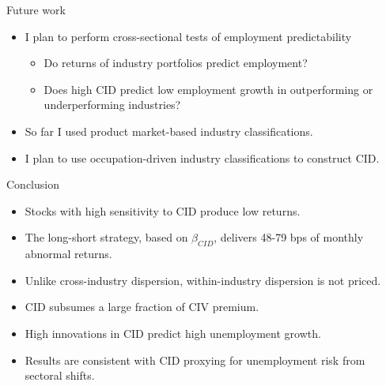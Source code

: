 \documentclass{beamer}
\begin{document}
\normalsize
\begin{frame}{Future work}
\begin{itemize}
    \item {I plan to perform cross-sectional tests of employment predictability}
    \begin{itemize}
        \item {Do returns of industry portfolios predict employment?}
        \item {Does high CID predict low employment growth in outperforming or underperforming industries?}
    \end{itemize}
    \item {So far I used product market-based industry classifications.}
    \item {I plan to use occupation-driven industry classifications to construct CID.}
\end{itemize}
\end{frame}


\normalsize
\begin{frame}{Conclusion}
\begin{itemize}
    \item {Stocks with high sensitivity to CID produce low returns.}
    \item {The long-short strategy, based on $\beta_{CID}$, delivers 48-79 bps of monthly abnormal returns.}
    \item {Unlike cross-industry dispersion, within-industry dispersion is not priced.}
    \item {CID subsumes a large fraction of CIV premium.}
    \item {High innovations in CID predict high unemployment growth.}
    \item {Results are consistent with CID proxying for unemployment risk from sectoral shifts.}
\end{itemize}
\end{frame}
\end{document}
